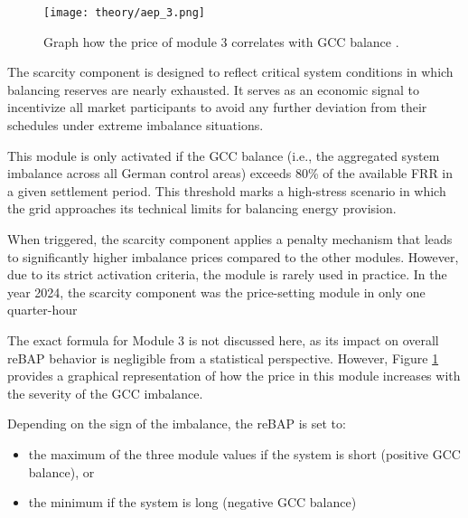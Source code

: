 \documentclass[class=scrbook, crop=false]{standalone}
\begin{document}


 \begin{figure}[ht]
            \centering
            \texttt{[image: theory/aep\_3.png]}
             \caption[Graph how the price of module 3 correlates with GCC balance]{Graph how the price of module 3 correlates with GCC balance .}
            \label{fig::aep_3}
 \end{figure}

The scarcity component is designed to reflect critical system conditions in which balancing reserves are nearly exhausted. It serves as an economic signal to incentivize all market participants to avoid any further deviation from their schedules under extreme imbalance situations.

This module is only activated if the \gls{GCC} balance (i.e., the aggregated system imbalance across all German control areas) exceeds 80\% of the available \gls{FRR} in a given settlement period. This threshold marks a high-stress scenario in which the grid approaches its technical limits for balancing energy provision.

When triggered, the scarcity component applies a penalty mechanism that leads to significantly higher imbalance prices compared to the other modules. However, due to its strict activation criteria, the module is rarely used in practice. In the year 2024, the scarcity component was the price-setting module in only one quarter-hour 

The exact formula for Module 3 is not discussed here, as its impact on overall \gls{reBAP} behavior is negligible from a statistical perspective. However, Figure \ref{fig::aep_3} provides a graphical representation of how the price in this module increases with the severity of the \gls{GCC} imbalance.

Depending on the sign of the imbalance, the \gls{reBAP} is set to:
\begin{itemize}
\item the maximum of the three module values if the system is short (positive \gls{GCC} balance), or
\item the minimum if the system is long (negative \gls{GCC} balance)
\end{itemize}
\end{document}
